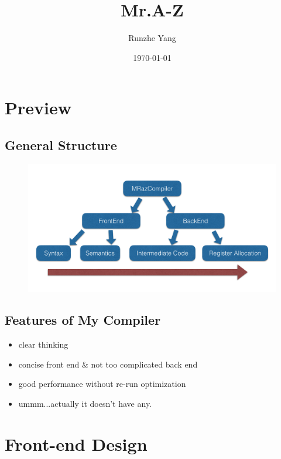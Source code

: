 \documentclass{beamer}
\begin{document}
\title{Mr.A-Z}
\author{Runzhe Yang}
\date{\today}
\frame{\titlepage}

\section{Preview}
\subsection{General Structure}
\begin{frame}
	\begin{figure}
		\centering
		\includegraphics[width = \textwidth]{structure_1}
	\end{figure}
\end{frame}

\subsection{Features of My Compiler}
\begin{frame}
	\begin{itemize}
		\item clear thinking
		\item concise front end \& not too complicated back end
		\item good performance without re-run optimization
		\item ummm...actually it doesn't have any.
	\end{itemize}
\end{frame}

\section{Front-end Design}
\end{document}
